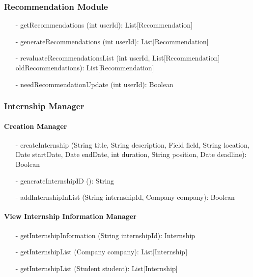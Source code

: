\subsubsection{Recommendation Module}
\begin{itemize}
    \item[-] getRecommendations (int userId): List[Recommendation]
    \item[-] generateRecommendations (int userId): List[Recommendation]
    \item[-] revaluateRecommendationsList (int userId, List[Recommendation] 
    oldRecommendations): List[Recommendation]
    \item[-] needRecommendationUpdate (int userId): Boolean
\end{itemize}


\subsubsection{Internship Manager}
\paragraph{Creation Manager}
\begin{itemize}
    \item[-] createInternship (String title, String description, Field field, String location, Date startDate, Date endDate, int duration, String position, Date deadline): Boolean
    \item[-] generateInternshipID (): String
    \item[-] addInternshipInList (String internshipId, Company company): Boolean
\end{itemize}

\paragraph{View Internship Information Manager}
\begin{itemize}
    \item[-] getInternshipInformation (String internshipId): Internship
    \item[-] getInternshipList (Company company): List[Internship]
    \item[-] getInternshipList (Student student): List[Internship]
\end{itemize}

